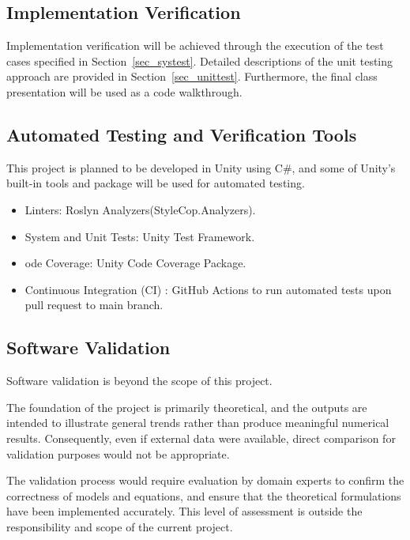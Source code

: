 \documentclass[12pt, titlepage]{article}
\begin{document}
\subsection{Implementation Verification}

Implementation verification will be achieved through the execution of the 
test cases specified in Section~\ref{sec_systest}. Detailed descriptions of 
the unit testing approach are provided in Section~\ref{sec_unittest}. 
Furthermore, the final class presentation will be used as a code walkthrough.

\subsection{Automated Testing and Verification Tools} \label{auto_tool}

This project is planned to be developed in Unity using C\#, and some of Unity's 
built-in tools and package will be used for automated testing.

\begin{itemize}
\item Linters: Roslyn Analyzers(StyleCop.Analyzers).

\item System and Unit Tests: Unity Test Framework.

\item ode Coverage: Unity Code Coverage Package.

\item Continuous Integration (CI) : GitHub Actions to run automated tests upon 
pull request to main branch.
\end{itemize}

\subsection{Software Validation} \label{soft_valid}

Software validation is beyond the scope of this project.

The foundation of the project is primarily theoretical, and the outputs are 
intended to illustrate general trends rather than produce meaningful numerical 
results. Consequently, even if external data were available, direct comparison 
for validation purposes would not be appropriate.

The validation process would require evaluation by domain experts to confirm 
the correctness of models and equations, and ensure that the theoretical 
formulations have been implemented accurately. This level of assessment is 
outside the responsibility and scope of the current project.
\end{document}
